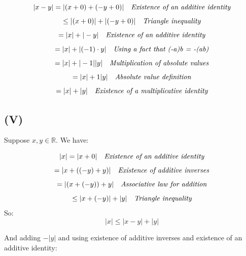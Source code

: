 \documentclass{article}
\begin{document}
\begin{equation*}
	|x - y| = |(x + 0) + (-y + 0)| \ \ \ \emph{Existence of an additive identity}
\end{equation*}
\begin{equation*}
	\leq |(x + 0)| + |(-y + 0)| \ \ \ \emph{Triangle inequality}
\end{equation*}
\begin{equation*}
	= |x| + |-y| \ \ \ \emph{Existence of an additive identity}
\end{equation*}
\begin{equation*}
	= |x| + |(-1) \cdot y| \ \ \ \emph{Using a fact that (-a)b = -(ab)}
\end{equation*}
\begin{equation*}
	= |x| + |-1||y| \ \ \ \emph{Multiplication of absolute values}
\end{equation*}
\begin{equation*}
	= |x| + 1|y| \ \ \ \emph{Absolute value definition}
\end{equation*}
\begin{equation*}
	= |x| + |y| \ \ \ \emph{Existence of a multiplicative identity}
\end{equation*}

\subsection*{(V)}

Suppose \(x, y \in \mathbb{R}\). We have:

\begin{equation*}
	|x| = |x + 0| \ \ \ \emph{Existence of an additive identity}
\end{equation*}
\begin{equation*}
	= |x + ((-y) + y)| \ \ \ \emph{Existence of additive inverses}
\end{equation*}
\begin{equation*}
	= |(x + (-y)) + y| \ \ \ \emph{Associative law for addition}
\end{equation*}
\begin{equation*}
	\leq |x + (-y)| + |y| \ \ \ \emph{Triangle inequality}
\end{equation*}
So:
\begin{equation*}
	|x| \leq |x - y| + |y|
\end{equation*}

And adding \(-|y|\) and using existence of additive inverses and existence of an additive identity:
\end{document}
